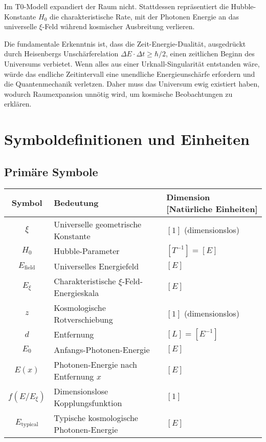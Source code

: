 \documentclass[12pt,a4paper]{article}
\begin{document}
	\begin{revolutionary}
		Im T0-Modell expandiert der Raum nicht. Stattdessen repräsentiert die Hubble-Konstante $H_0$ die charakteristische Rate, mit der Photonen Energie an das universelle $\xi$-Feld während kosmischer Ausbreitung verlieren.
	\end{revolutionary}
	
	Die fundamentale Erkenntnis ist, dass die Zeit-Energie-Dualität, ausgedrückt durch Heisenbergs Unschärferelation $\Delta E \cdot \Delta t \geq \hbar/2$, einen zeitlichen Beginn des Universums verbietet. Wenn alles aus einer Urknall-Singularität entstanden wäre, würde das endliche Zeitintervall eine unendliche Energieunschärfe erfordern und die Quantenmechanik verletzen. Daher muss das Universum ewig existiert haben, wodurch Raumexpansion unnötig wird, um kosmische Beobachtungen zu erklären.
	
	\section{Symboldefinitionen und Einheiten}
	
	\subsection{Primäre Symbole}
	
	\begin{longtable}{|c|l|l|}
		\hline
		\textbf{Symbol} & \textbf{Bedeutung} & \textbf{Dimension [Natürliche Einheiten]} \\
		\hline
		$\xi$ & Universelle geometrische Konstante & $[1]$ (dimensionslos) \\
		$H_0$ & Hubble-Parameter & $[T^{-1}] = [E]$ \\
		$E_{\text{field}}$ & Universelles Energiefeld & $[E]$ \\
		$E_\xi$ & Charakteristische $\xi$-Feld-Energieskala & $[E]$ \\
		$z$ & Kosmologische Rotverschiebung & $[1]$ (dimensionslos) \\
		$d$ & Entfernung & $[L] = [E^{-1}]$ \\
		$E_0$ & Anfangs-Photonen-Energie & $[E]$ \\
		$E(x)$ & Photonen-Energie nach Entfernung $x$ & $[E]$ \\
		$f(E/E_\xi)$ & Dimensionslose Kopplungsfunktion & $[1]$ \\
		$E_{\text{typical}}$ & Typische kosmologische Photonen-Energie & $[E]$ \\
		\hline
	\end{longtable}
	
\end{document}
